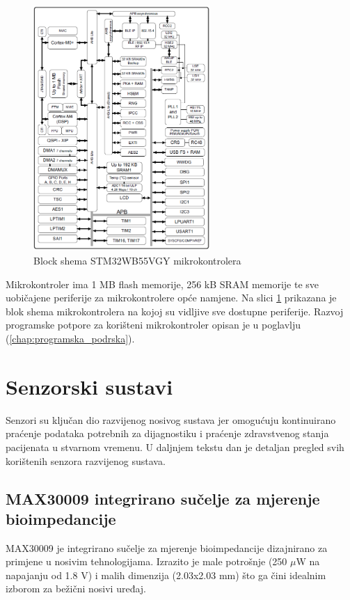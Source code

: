 \documentclass[../diplomski_rad.tex]{subfiles}
\begin{document}
\begin{figure}[htb!]
    \centering
    \includegraphics[width=0.6\textwidth]{Figures/stm32mikro.png} 
    \caption{Block shema STM32WB55VGY mikrokontrolera \cite{stm32mikro}}
    \label{slk:stm32mikro}
\end{figure}

Mikrokontroler ima 1 MB flash memorije, 256 kB SRAM memorije te sve uobičajene periferije za mikrokontrolere opće namjene. 
Na slici \ref{slk:stm32mikro} prikazana je blok shema mikrokontrolera na kojoj su vidljive sve dostupne periferije.
Razvoj programske potpore za korišteni mikrokontroler opisan je u poglavlju (\ref{chap:programska_podrska}).

\section{Senzorski sustavi}

Senzori su ključan dio razvijenog nosivog sustava jer omogućuju kontinuirano praćenje podataka potrebnih 
za dijagnostiku i praćenje zdravstvenog stanja pacijenata u stvarnom vremenu.
U daljnjem tekstu dan je detaljan pregled svih korištenih senzora razvijenog sustava.

\subsection{MAX30009 integrirano sučelje za mjerenje bioimpedancije}

MAX30009 je integrirano sučelje za mjerenje bioimpedancije dizajnirano za primjene u nosivim tehnologijama. 
Izrazito je male potrošnje (250 $\mu$W na napajanju od 1.8 V) \cite{max30009} i malih dimenzija (2.03x2.03 mm) što ga čini idealnim izborom za bežični nosivi uređaj.  
\end{document}
